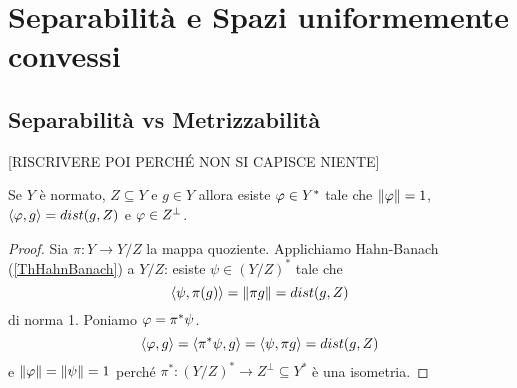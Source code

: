 \chapter{Separabilit\`a e Spazi uniformemente convessi}

\section{Separabilit\`a vs Metrizzabilit\`a}

[RISCRIVERE POI PERCH\'E NON SI CAPISCE NIENTE]

\begin{lemma}\label{LmFunzionaleAssumeDistanzaPerFissatoElemento}
Se $Y$ \`e normato, $Z\subseteq Y$ e $g\in Y$ allora esiste $\varphi\in Y^\ast$ tale che $\left\Vert{\varphi}\right\Vert=1$, $\left\langle {\varphi,g}\right\rangle=dist(g,Z)$ e $\varphi\in Z^\perp$.
\end{lemma}
\begin{proof}
	Sia $\pi:Y\to Y/Z$ la mappa quoziente. Applichiamo Hahn-Banach (\ref{ThHahnBanach}) a $Y/Z$: esiste $\psi\in (Y/Z)^\ast$ tale che \[\left\langle {\psi,\pi(g)}\right\rangle=\left\Vert{\pi g}\right\Vert=dist(g,Z)\]
	di norma 1. Poniamo $\varphi=\pi^\ast\psi$.
	\[\left\langle {\varphi,g}\right\rangle=\left\langle {\pi^\ast\psi,g}\right\rangle=\left\langle {\psi,\pi g}\right\rangle=dist(g,Z)\]
	e $\left\Vert{\varphi}\right\Vert=\left\Vert{\psi}\right\Vert=1$ perch\'e $\pi^\ast:(Y/Z)^\ast\to Z^\perp\subseteq Y^\ast$ \`e una isometria.
\end{proof}

